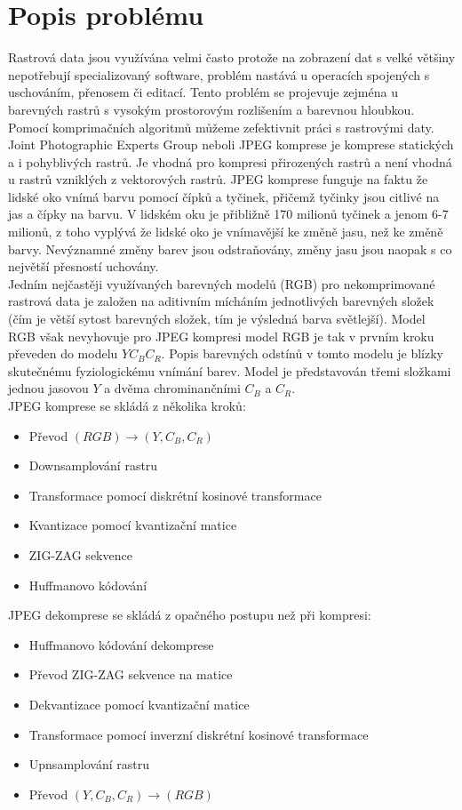 \section*{Popis problému}
Rastrová data jsou využívána velmi často protože na zobrazení dat s velké většiny nepotřebují specializovaný software, problém nastává u operacích spojených s uschováním, přenosem či editací. Tento problém se projevuje zejména u barevných rastrů s vysokým prostorovým rozlišením a barevnou hloubkou. Pomocí komprimačních algoritmů můžeme zefektivnit práci s rastrovými daty.
Joint Photographic Experts Group neboli JPEG komprese je komprese statických a i pohyblivých rastrů. Je vhodná pro kompresi přirozených rastrů a není vhodná u rastrů vzniklých z vektorových rastrů. JPEG komprese funguje na faktu že lidské oko vnímá barvu pomocí čípků a tyčinek, přičemž tyčinky jsou citlivé na jas a čípky na barvu. V lidském oku je přibližně 170 milionů tyčinek a jenom 6-7 milionů, z toho vyplývá že lidské oko je vnímavější ke změně jasu, než ke změně barvy. Nevýznamné změny barev jsou odstraňovány, změny jasu jsou naopak s co největší přesností uchovány\cite{pIDhmNtdwMgbcGoe}.\\
Jedním nejčastěji využívaných barevných modelů (RGB) pro nekomprimované rastrová data je založen na aditivním mícháním jednotlivých barevných složek (čím je větší sytost barevných složek, tím je výsledná barva světlejší). Model RGB však nevyhovuje pro JPEG kompresi model RGB je tak v prvním kroku převeden do modelu $YC_BC_R$. Popis barevných odstínů v tomto modelu je blízky skutečnému fyziologickému vnímání barev. Model je představován třemi složkami jednou jasovou $Y$ a dvěma chrominančními $C_B$ a $C_R$\cite{pIDhmNtdwMgbcGoe}.\\
JPEG komprese se skládá z několika kroků\cite{pIDhmNtdwMgbcGoe}:
\begin{itemize}
    \item Převod $(RGB) \longrightarrow (Y,C_B,C_R)$
    \item Downsamplování rastru
    \item Transformace pomocí diskrétní kosinové transformace
    \item Kvantizace pomocí kvantizační matice
    \item ZIG-ZAG sekvence
    \item Huffmanovo kódování
\end{itemize}
JPEG dekomprese se skládá z opačného postupu než při kompresi\cite{pIDhmNtdwMgbcGoe}:
\begin{itemize}
    \item Huffmanovo kódování dekomprese
    \item Převod ZIG-ZAG sekvence na matice
    \item Dekvantizace pomocí kvantizační matice
    \item Transformace pomocí inverzní diskrétní kosinové transformace
    \item Upnsamplování rastru
    \item Převod $(Y,C_B,C_R) \longrightarrow (RGB)$
\end{itemize}
